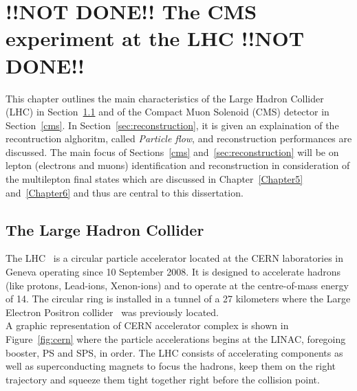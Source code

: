 \chapter{!!NOT DONE!! The CMS experiment at the LHC !!NOT DONE!!} \label{Chapter2} 



This chapter outlines the main characteristics of the Large
Hadron Collider (LHC) in Section~\ref{lhc} and of the Compact Muon Solenoid (CMS)
detector in Section~\ref{cms}. In Section~\ref{sec:reconstruction}, it is
given an explaination of the recontruction alghoritm, called
\emph{Particle flow}, and reconstruction performances are
discussed. The main focus of Sections~\ref{cms}
and~\ref{sec:reconstruction} will be on lepton (electrons and muons) identification and
reconstruction in consideration of the multilepton final states which are
discussed in Chapter~\ref{Chapter5} and~\ref{Chapter6} and thus are
central to this dissertation.



\section{The Large Hadron Collider}\label{lhc}

The LHC~\cite{Brning2004LHCDR} is a circular particle accelerator
located at the CERN laboratories in Geneva operating since 10
September 2008. It is
designed to accelerate hadrons (like protons, Lead-ions, Xenon-ions) and to
operate at the centre-of-mass energy of 14\TeV.
The circular ring is installed in a tunnel of a 27 kilometers where
the Large Electron Positron collider~\cite{Lep:designReport} was
previously located.\\
A graphic representation of CERN accelerator
complex is shown in Figure~\ref{fig:cern} where the particle
accelerations begins at the LINAC, foregoing booster, PS and SPS, in
order. The LHC consists of accelerating components as well as
superconducting magnets to focus the hadrons, keep them on the right
trajectory and squeeze them tight together right before the
collision point. 


